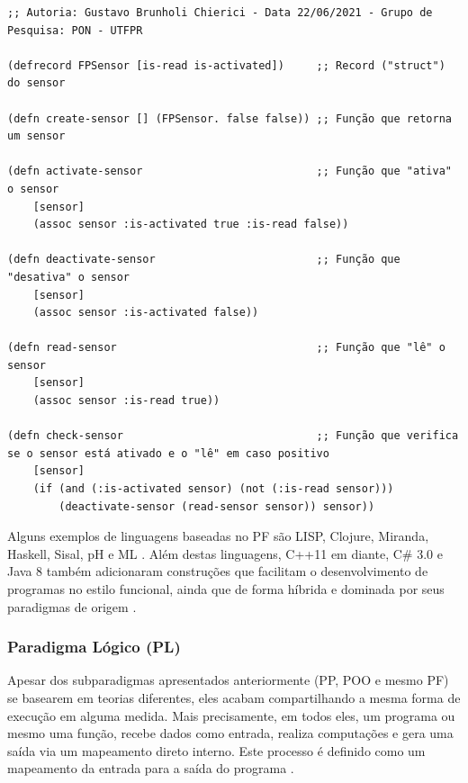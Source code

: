 \begin{lstlisting}[caption = {Exemplo de
aplicação de sensor em Clojure}, float=htb, source = {Autoria própria}, label =
{cod:sensor_clj}]
;; Autoria: Gustavo Brunholi Chierici - Data 22/06/2021 - Grupo de Pesquisa: PON - UTFPR

(defrecord FPSensor [is-read is-activated])     ;; Record ("struct") do sensor

(defn create-sensor [] (FPSensor. false false)) ;; Função que retorna um sensor

(defn activate-sensor                           ;; Função que "ativa" o sensor
    [sensor]
    (assoc sensor :is-activated true :is-read false))

(defn deactivate-sensor                         ;; Função que "desativa" o sensor
    [sensor]
    (assoc sensor :is-activated false))

(defn read-sensor                               ;; Função que "lê" o sensor
    [sensor]
    (assoc sensor :is-read true))

(defn check-sensor                              ;; Função que verifica se o sensor está ativado e o "lê" em caso positivo
    [sensor]
    (if (and (:is-activated sensor) (not (:is-read sensor)))
        (deactivate-sensor (read-sensor sensor)) sensor))
\end{lstlisting}

Alguns exemplos de linguagens baseadas no PF são LISP, Clojure, Miranda,
Haskell, Sisal, pH e ML \cite{msc_Banaszewski_2009}. Além destas linguagens,
C++11 em diante, C\# 3.0 e Java 8 também adicionaram construções que facilitam o
desenvolvimento de programas no estilo funcional, ainda que de forma híbrida e
dominada por seus paradigmas de origem \cite{bhadwal_2020}.

\subsubsection{Paradigma Lógico (PL)}

Apesar dos subparadigmas apresentados anteriormente (PP, POO e mesmo PF) se
basearem em teorias diferentes, eles acabam compartilhando a mesma forma de
execução em alguma medida. Mais precisamente, em todos eles, um programa ou
mesmo uma função, recebe dados como entrada, realiza computações e gera uma
saída via um mapeamento direto interno. Este processo é definido como um
mapeamento da entrada para a saída do programa
\cite{watt_2004,msc_Banaszewski_2009}.

